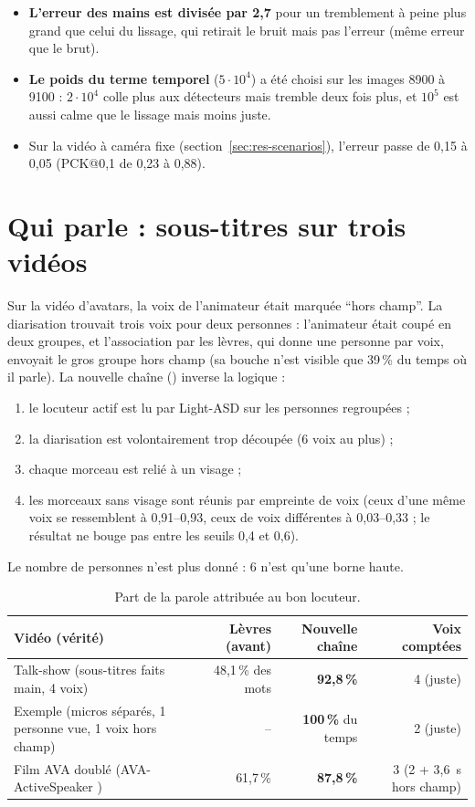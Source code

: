 \documentclass[11pt,a4paper]{report}
\newcommand{\code}[1]{\texttt{\detokenize{#1}}}
\begin{document}
\begin{itemize}
    \item \textbf{L'erreur des mains est divisée par 2,7} pour un tremblement à peine plus grand que celui du lissage, qui retirait le
    bruit mais pas l'erreur (même erreur que le brut).
    \item \textbf{Le poids du terme temporel} ($5\cdot10^4$) a été choisi sur les images 8900 à 9100 : $2\cdot10^4$ colle plus aux
    détecteurs mais tremble deux fois plus, et $10^5$ est aussi calme que le lissage mais moins juste.
    \item Sur la vidéo à caméra fixe (section~\ref{sec:res-scenarios}), l'erreur passe de 0,15 à 0,05 (PCK@0,1 de 0,23 à 0,88).
\end{itemize}

\section{Qui parle : sous-titres sur trois vidéos}
\label{sec:res-speakers}

Sur la vidéo d'avatars, la voix de l'animateur était marquée \enquote{hors champ}. La diarisation trouvait trois voix pour deux
personnes : l'animateur était coupé en deux groupes, et l'association par les lèvres, qui donne une personne par voix, envoyait le
gros groupe hors champ (sa bouche n'est visible que 39\,\% du temps où il parle). La nouvelle chaîne (\code{speakers.py}) inverse la
logique :
\begin{enumerate}
    \item le locuteur actif est lu par Light-ASD \cite{liao2023lightasd} sur les personnes regroupées ;
    \item la diarisation est volontairement trop découpée (6 voix au plus) ;
    \item chaque morceau est relié à un visage ;
    \item les morceaux sans visage sont réunis par empreinte de voix (ceux d'une même voix se ressemblent à 0,91--0,93, ceux de voix
    différentes à 0,03--0,33 ; le résultat ne bouge pas entre les seuils 0,4 et 0,6).
\end{enumerate}
Le nombre de personnes n'est plus donné : 6 n'est qu'une borne haute.

\begin{table}[H]
\centering
\caption{Part de la parole attribuée au bon locuteur.}
\label{tab:speakers}
\small
\begin{tabularx}{\textwidth}{@{}Yrrr@{}}
\toprule
Vidéo (vérité) & Lèvres (avant) & \textbf{Nouvelle chaîne} & Voix comptées \\
\midrule
Talk-show (sous-titres faits main, 4 voix) & 48,1\,\% des mots & \textbf{92,8\,\%} & 4 (juste) \\
Exemple (micros séparés, 1 personne vue, 1 voix hors champ) & -- & \textbf{100\,\%} du temps & 2 (juste) \\
Film AVA doublé (AVA-ActiveSpeaker \cite{roth2020ava}) & 61,7\,\% & \textbf{87,8\,\%} & 3 (2 + 3,6~s hors champ) \\
\bottomrule
\end{tabularx}
\end{table}
\end{document}
